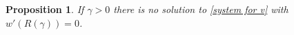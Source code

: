 \documentclass[11pt,a4paper]{article}
\numberwithin{equation}{section}
\theoremstyle{plain}
\newtheorem{proposition}[theorem]{Proposition}
\theoremstyle{remark}
\begin{document}


\begin{proposition}\label{ChatGPT}
If $\gamma>0$ there is no solution to \eqref{system for v} with $w'(R(\gamma))=0$.
\end{proposition}
\end{document}

